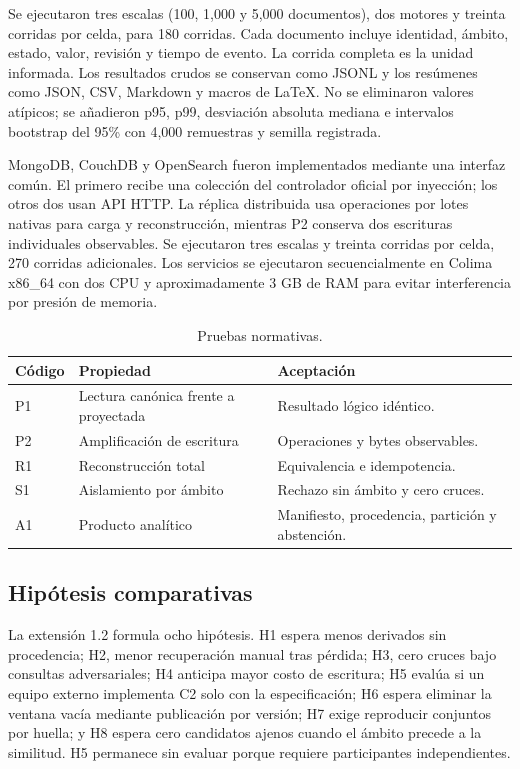 \documentclass[11pt]{article}
\begin{document}
Se ejecutaron tres escalas (100, 1,000 y 5,000 documentos), dos motores y treinta corridas por celda, para 180 corridas. Cada documento incluye identidad, ámbito, estado, valor, revisión y tiempo de evento. La corrida completa es la unidad informada. Los resultados crudos se conservan como JSONL y los resúmenes como JSON, CSV, Markdown y macros de \LaTeX. No se eliminaron valores atípicos; se añadieron p95, p99, desviación absoluta mediana e intervalos bootstrap del 95\% con 4,000 remuestras y semilla registrada.

MongoDB, CouchDB y OpenSearch fueron implementados mediante una interfaz común. El primero recibe una colección del controlador oficial por inyección; los otros dos usan API HTTP. La réplica distribuida usa operaciones por lotes nativas para carga y reconstrucción, mientras P2 conserva dos escrituras individuales observables. Se ejecutaron tres escalas y treinta corridas por celda, 270 corridas adicionales. Los servicios se ejecutaron secuencialmente en Colima x86\_64 con dos CPU y aproximadamente 3 GB de RAM para evitar interferencia por presión de memoria.

\begin{table}[h]
\centering
\caption{Pruebas normativas.}
\begin{tabularx}{\textwidth}{lXl}
\toprule Código & Propiedad & Aceptación \\ \midrule
P1 & Lectura canónica frente a proyectada & Resultado lógico idéntico.\\
P2 & Amplificación de escritura & Operaciones y bytes observables.\\
R1 & Reconstrucción total & Equivalencia e idempotencia.\\
S1 & Aislamiento por ámbito & Rechazo sin ámbito y cero cruces.\\
A1 & Producto analítico & Manifiesto, procedencia, partición y abstención.\\ \bottomrule
\end{tabularx}
\end{table}

\subsection{Hipótesis comparativas}
La extensión 1.2 formula ocho hipótesis. H1 espera menos derivados sin procedencia; H2, menor recuperación manual tras pérdida; H3, cero cruces bajo consultas adversariales; H4 anticipa mayor costo de escritura; H5 evalúa si un equipo externo implementa C2 solo con la especificación; H6 espera eliminar la ventana vacía mediante publicación por versión; H7 exige reproducir conjuntos por huella; y H8 espera cero candidatos ajenos cuando el ámbito precede a la similitud. H5 permanece sin evaluar porque requiere participantes independientes.
\end{document}
